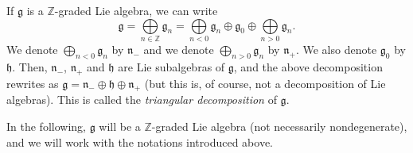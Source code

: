 \documentclass
[numbers=enddot,12pt,final,onecolumn,german,notitlepage]{scrartcl}%
\theoremstyle{definition}
\begin{document}
If $\mathfrak{g}$ is a $\mathbb{Z}$-graded Lie algebra, we can write%
\[
\mathfrak{g}=\bigoplus\limits_{n\in\mathbb{Z}}\mathfrak{g}_{n}=\bigoplus
\limits_{n<0}\mathfrak{g}_{n}\oplus\mathfrak{g}_{0}\oplus\bigoplus
\limits_{n>0}\mathfrak{g}_{n}.
\]
We denote $\bigoplus\limits_{n<0}\mathfrak{g}_{n}$ by $\mathfrak{n}_{-}$ and
we denote $\bigoplus\limits_{n>0}\mathfrak{g}_{n}$ by $\mathfrak{n}_{+}$. We
also denote $\mathfrak{g}_{0}$ by $\mathfrak{h}$. Then, $\mathfrak{n}_{-}$,
$\mathfrak{n}_{+}$ and $\mathfrak{h}$ are Lie subalgebras of $\mathfrak{g}$,
and the above decomposition rewrites as $\mathfrak{g}=\mathfrak{n}_{-}%
\oplus\mathfrak{h}\oplus\mathfrak{n}_{+}$ (but this is, of course, not a
decomposition of Lie algebras). This is called the \textit{triangular
decomposition} of $\mathfrak{g}$.

In the following, $\mathfrak{g}$ will be a $\mathbb{Z}$-graded Lie algebra
(not necessarily nondegenerate), and we will work with the notations
introduced above.
\end{document}
